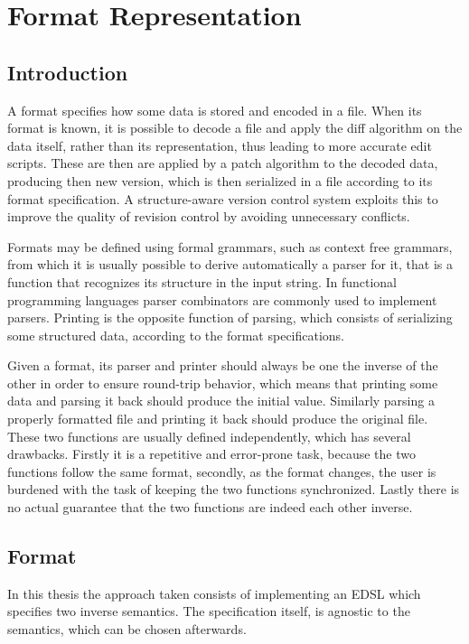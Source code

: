 \documentclass[../Thesis.tex]{subfiles}
\begin{document}
\chapter{Format Representation}
\label{chapter:FormatRepresentation}

\section{Introduction}
A format specifies how some data is stored and encoded in a file.
When its format is known, it is possible to decode a file and apply the diff algorithm on the data itself, rather than its representation, thus leading to more accurate edit scripts. These are then are applied by a patch algorithm to the decoded data, producing then new version, which is then serialized in a file according to its format specification.
A structure-aware version control system exploits this to improve the quality of revision control by avoiding unnecessary conflicts.

Formats may be defined using formal grammars, such as context free grammars, from which it is usually possible to derive automatically a parser for it, that is a function that recognizes its structure in the input string. In functional programming languages parser combinators are commonly used to implement parsers.
Printing is the opposite function of parsing, which consists of serializing some structured data, according to the format specifications.

Given a format, its parser and printer should always be one the inverse of the other in order to ensure round-trip behavior, which means that printing some data and parsing it back should produce the initial value. Similarly parsing a properly formatted file and printing it back should produce the original file.
These two functions are usually defined independently, which has several drawbacks. Firstly it is a repetitive and error-prone task, because the two functions follow the same format, secondly, as the format changes, the user is burdened with the task of keeping the two functions synchronized. Lastly there is no actual guarantee that the two functions are indeed each other inverse.

\section{Format}
In this thesis the approach taken consists of implementing an EDSL which specifies two inverse semantics. The specification itself, is agnostic to the semantics, which can be chosen afterwards.
\end{document}
